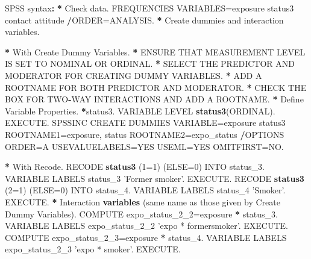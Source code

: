 \documentclass[a4paper]{book}
\newenvironment{Shaded}{\begin{snugshade}}{\end{snugshade}}
\newcommand{\KeywordTok}[1]{\textcolor[rgb]{0,0,0}{\textbf{#1}}}
\newcommand{\DataTypeTok}[1]{\textcolor[rgb]{0,0,0}{#1}}
\newcommand{\DecValTok}[1]{\textcolor[rgb]{0.00,0.00,0.00}{#1}}
\newcommand{\StringTok}[1]{\textcolor[rgb]{0.00,0.00,0.00}{#1}}
\newcommand{\OperatorTok}[1]{\textcolor[rgb]{0.00,0.00,0.00}{\textbf{#1}}}
\newcommand{\ErrorTok}[1]{\textcolor[rgb]{0.00,0.00,0.00}{\textbf{#1}}}
\newcommand{\NormalTok}[1]{#1}
\theoremstyle{definition}
\theoremstyle{definition}
\theoremstyle{definition}
\theoremstyle{remark}
\begin{document}
\begin{Shaded}
\begin{Highlighting}[]
\NormalTok{SPSS syntax}\OperatorTok{:}\StringTok{  }
\StringTok{  }
\ErrorTok{*}\StringTok{ }\NormalTok{Check data.  }
\NormalTok{FREQUENCIES VARIABLES=exposure status3 contact attitude  }
  \OperatorTok{/}\NormalTok{ORDER=ANALYSIS.  }
\OperatorTok{*}\StringTok{ }\NormalTok{Create dummies and interaction variables.  }

\OperatorTok{*}\StringTok{ }\NormalTok{With Create Dummy Variables.  }
\OperatorTok{*}\StringTok{ }\NormalTok{ENSURE THAT MEASUREMENT LEVEL IS SET TO NOMINAL OR ORDINAL.}
\OperatorTok{*}\StringTok{ }\NormalTok{SELECT THE PREDICTOR AND MODERATOR FOR CREATING DUMMY VARIABLES.}
\OperatorTok{*}\StringTok{ }\NormalTok{ADD A ROOTNAME FOR BOTH PREDICTOR AND MODERATOR.}
\OperatorTok{*}\StringTok{ }\NormalTok{CHECK THE BOX FOR TWO}\OperatorTok{-}\NormalTok{WAY INTERACTIONS AND ADD A ROOTNAME.}
\OperatorTok{*}\StringTok{ }\NormalTok{Define Variable Properties.  }
\OperatorTok{*}\NormalTok{status3.  }
\NormalTok{VARIABLE LEVEL  }\KeywordTok{status3}\NormalTok{(ORDINAL).  }
\NormalTok{EXECUTE.  }
\NormalTok{SPSSINC CREATE DUMMIES VARIABLE=exposure status3   }
\NormalTok{ROOTNAME1=exposure, status ROOTNAME2=expo_status   }
\OperatorTok{/}\NormalTok{OPTIONS ORDER=A USEVALUELABELS=YES USEML=YES OMITFIRST=NO.  }

\OperatorTok{*}\StringTok{ }\NormalTok{With Recode.  }
\NormalTok{RECODE }\KeywordTok{status3}\NormalTok{ (}\DecValTok{1}\NormalTok{=}\DecValTok{1}\NormalTok{) (}\DataTypeTok{ELSE=}\DecValTok{0}\NormalTok{) INTO status_}\DecValTok{3}\NormalTok{.  }
\NormalTok{VARIABLE LABELS  status_}\DecValTok{3} \StringTok{'Former smoker'}\NormalTok{.  }
\NormalTok{EXECUTE.  }
\NormalTok{RECODE }\KeywordTok{status3}\NormalTok{ (}\DecValTok{2}\NormalTok{=}\DecValTok{1}\NormalTok{) (}\DataTypeTok{ELSE=}\DecValTok{0}\NormalTok{) INTO status_}\DecValTok{4}\NormalTok{.  }
\NormalTok{VARIABLE LABELS  status_}\DecValTok{4} \StringTok{'Smoker'}\NormalTok{.  }
\NormalTok{EXECUTE.  }
\OperatorTok{*}\StringTok{ }\NormalTok{Interaction }\KeywordTok{variables}\NormalTok{ (same name as those given by Create Dummy Variables).  }
\NormalTok{COMPUTE expo_status_2_}\DecValTok{2}\NormalTok{=exposure }\OperatorTok{*}\StringTok{ }\NormalTok{status_}\DecValTok{3}\NormalTok{.  }
\NormalTok{VARIABLE LABELS  expo_status_2_}\DecValTok{2} \StringTok{'expo * formersmoker'}\NormalTok{.  }
\NormalTok{EXECUTE.  }
\NormalTok{COMPUTE expo_status_2_}\DecValTok{3}\NormalTok{=exposure }\OperatorTok{*}\StringTok{ }\NormalTok{status_}\DecValTok{4}\NormalTok{.  }
\NormalTok{VARIABLE LABELS  expo_status_2_}\DecValTok{3} \StringTok{'expo * smoker'}\NormalTok{.  }
\NormalTok{EXECUTE.  }


\end{Highlighting}
\end{Shaded}
\end{document}
